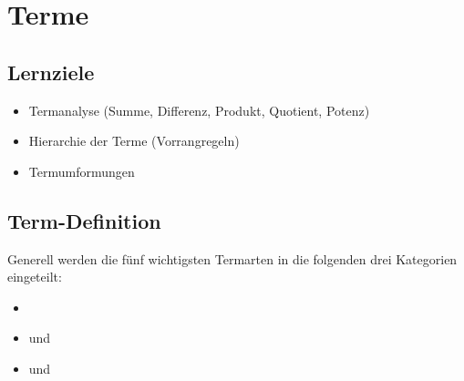 
\section{Terme}

\subsection*{Lernziele}

\begin{itemize}
 \item Termanalyse (Summe, Differenz, Produkt, Quotient, Potenz)
 \item Hierarchie der Terme (Vorrangregeln)
 \item Termumformungen
\end{itemize}


\newpage

\subsection{Term-Definition}


Generell werden die fünf wichtigsten Termarten in die folgenden drei Kategorien eingeteilt:
\begin{itemize}
\item {}
\item {} und 
\item {} und 
\end{itemize}




